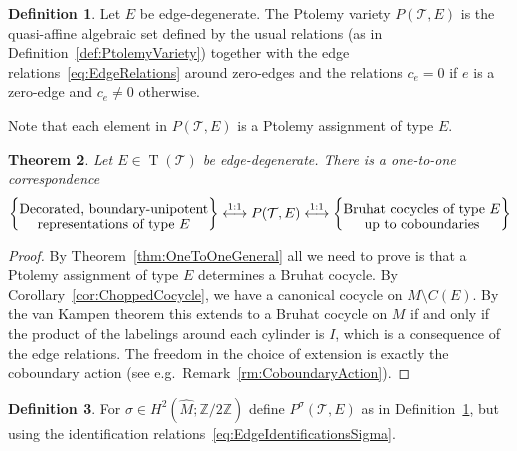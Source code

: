 \documentclass[11pt]{amsart}
\theoremstyle{plain}
\newtheorem{theorem}{Theorem}[section]
\theoremstyle{definition}
\newtheorem{definition}[theorem]{Definition}
\numberwithin{equation}{section}
\newcommand{\Z}{\mathbb Z}
\newcommand{\T}{\mathcal T}
\DeclareMathOperator{\TE}{T}
\begin{document}
\begin{definition}\label{def:PtolemyMild} Let $E$ be edge-degenerate. The Ptolemy variety $P(\T,E)$ is the quasi-affine algebraic set defined by the usual relations (as in Definition~\ref{def:PtolemyVariety}) together with the edge relations~\eqref{eq:EdgeRelations} around zero-edges and the relations $c_e=0$ if $e$ is a zero-edge and $c_e\neq 0$ otherwise. 
\end{definition}
Note that each element in $P(\T,E)$ is a Ptolemy assignment of type $E$.







\begin{theorem}\label{thm:OneOneMild}
Let $E\in \TE(\T)$ be edge-degenerate. There is a one-to-one correspondence
\begin{equation}\label{eq:OneOneMild}
\left\{\txt{Decorated, boundary-unipotent\\representations of type $E$}\right\}\overset{\text{1:1}}{\longleftrightarrow}P(\T,E)\overset{\text{1:1}}{\longleftrightarrow}\left\{\txt{Bruhat cocycles of type $E$\\ up to coboundaries}\right\}
\end{equation}
\end{theorem}
\begin{proof}
By Theorem~\ref{thm:OneToOneGeneral} all we need to prove is that a Ptolemy assignment of type $E$ determines a Bruhat cocycle. By Corollary~\ref{cor:ChoppedCocycle}, we have a canonical cocycle on $M\setminus C(E)$. By the van Kampen theorem this extends to a Bruhat cocycle on $M$ if and only if the product of the labelings around each cylinder is $I$, which is a consequence of the edge relations. The freedom in the choice of extension is exactly the coboundary action (see e.g.~Remark~\ref{rm:CoboundaryAction}).
\end{proof}

\begin{definition}
For $\sigma\in H^2(\widehat M;\Z/2\Z)$ define $P^\sigma(\T,E)$ as in Definition~\ref{def:PtolemyMild}, but using the identification relations~\eqref{eq:EdgeIdentificationsSigma}.
\end{definition}
\end{document}
